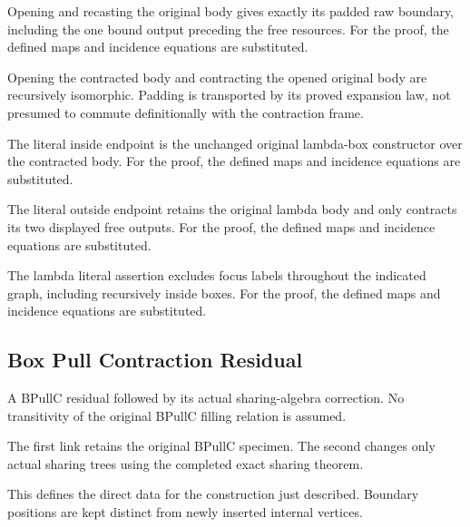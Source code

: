 Opening and recasting the original body gives exactly its padded raw boundary, including the one bound output preceding the free resources.
For the proof, the defined maps and incidence equations are substituted.
\par{}

Opening the contracted body and contracting the opened original body are recursively isomorphic. Padding is transported by its proved expansion law, not presumed to commute definitionally with the contraction frame.
\par{}

The literal inside endpoint is the unchanged original lambda-box constructor over the contracted body.
For the proof, the defined maps and incidence equations are substituted.
\par{}

The literal outside endpoint retains the original lambda body and only contracts its two displayed free outputs.
For the proof, the defined maps and incidence equations are substituted.
\par{}

The lambda literal assertion excludes focus labels throughout the indicated graph, including recursively inside boxes.
For the proof, the defined maps and incidence equations are substituted.
\par{}

\subsection{Box Pull Contraction Residual}
A BPullC residual followed by its actual sharing-algebra correction. No transitivity of the original BPullC filling relation is assumed.

The first link retains the original BPullC specimen. The second changes only actual sharing trees using the completed exact sharing theorem.
\par{}

This defines the direct data for the construction just described. Boundary positions are kept distinct from newly inserted internal vertices.
\par{}

